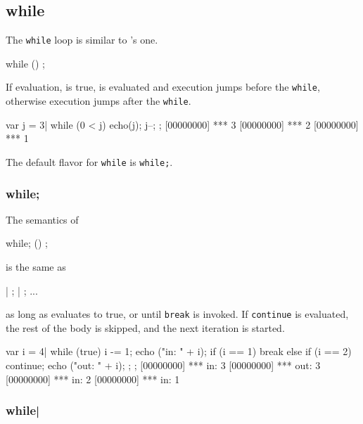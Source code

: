\subsection{while}

The \lstinline|while| loop is similar to \C's one.

\begin{urbiunchecked}
while ()
  ;
\end{urbiunchecked}

If  evaluation, is true,  is evaluated and
execution jumps before the \lstinline|while|, otherwise execution
jumps after the \lstinline|while|.

\begin{urbiscript}
var j = 3|
while (0 < j)
{
  echo(j);
  j--;
};
[00000000] *** 3
[00000000] *** 2
[00000000] *** 1
\end{urbiscript}

The default flavor for \lstinline|while| is \lstinline|while;|.

\subsubsection{while;}

The semantics of

\begin{urbiunchecked}
while; ()
  ;
\end{urbiunchecked}

\noindent
is the same as

\begin{urbiunchecked}
 |  ;  |  ; ...
\end{urbiunchecked}

\noindent
as long as  evaluates to true, or until \lstinline|break| is
invoked.  If \lstinline|continue| is evaluated, the rest of the body
is skipped, and the next iteration is started.

\begin{urbiscript}
{
  var i = 4|
  while (true)
  {
    i -= 1;
    echo ("in: " + i);
    if (i == 1)
      break
    else if (i == 2)
      continue;
    echo ("out: " + i);
  };
};
[00000000] *** in: 3
[00000000] *** out: 3
[00000000] *** in: 2
[00000000] *** in: 1
\end{urbiscript}


\subsubsection{while|}

